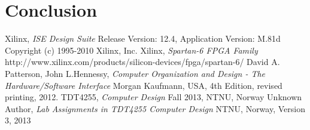 \documentclass{report}
\begin{document}
\chapter{Conclusion}

\newpage

\begin{thebibliography}{2}
	Xilinx,
	\emph{ISE Design Suite}
	Release Version: 12.4, Application Version: M.81d
	Copyright (c) 1995-2010 Xilinx, Inc.
	Xilinx,
	\emph{Spartan-6 FPGA Family}\newline
	http://www.xilinx.com/products/silicon-devices/fpga/spartan-6/
	David A. Patterson, John L.Hennessy, \newline
	\emph{Computer Organization and Design - The Hardware/Software Interface}
	Morgan Kaufmann, USA,
	4th Edition, revised printing,
	2012.
	TDT4255,
	\emph{Computer Design}
	Fall 2013,
	NTNU, Norway
	Unknown Author,
	\emph{Lab Assignments in TDT4255 Computer Design}
	NTNU, Norway,
	Version 3,
	2013
\end{thebibliography}


\end{document}

